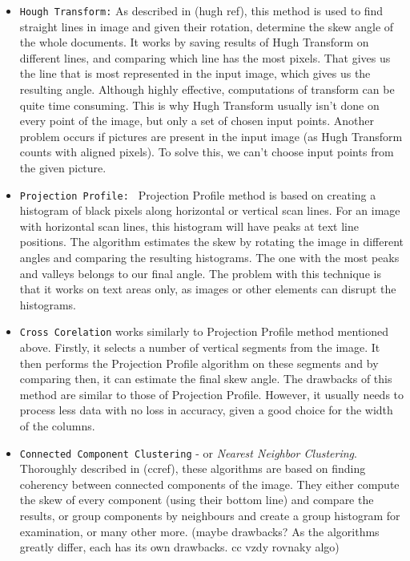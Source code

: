\begin{itemize}

\item\texttt{Hough Transform:} As described in (hugh ref), this method is used to find straight lines in image and given their rotation, determine the skew angle of the whole documents. It works by saving results of Hugh Transform on different lines, and comparing which line has the most pixels. That gives us the line that is most represented in the input image, which gives us the resulting angle. Although highly effective, computations of transform can be quite time consuming. This is why Hugh Transform usually isn't done on every point of the image, but only a set of chosen input points. Another problem occurs if pictures are present in the input image (as Hugh Transform counts with aligned pixels). To solve this, we can't choose input points from the given picture.

\item\texttt{Projection Profile: } Projection Profile method is based on creating a histogram of black pixels along horizontal or vertical scan lines. For an image with horizontal scan lines, this histogram will have peaks at text line positions. The algorithm estimates the skew by rotating the image in different angles and comparing the resulting histograms. The one with the most peaks and valleys belongs to our final angle. The problem with this technique is that it works on text areas only, as images or other elements can disrupt the histograms.

\item\texttt{Cross Corelation} works similarly to Projection Profile method mentioned above. Firstly, it selects a number of vertical segments from the image. It then performs the Projection Profile algorithm on these segments and by comparing then, it can estimate the final skew angle.
The drawbacks of this method are similar to those of Projection Profile. However, it usually needs to process less data with no loss in accuracy, given a good choice for the width of the columns.

\item\texttt{Connected Component Clustering} - or  \emph{Nearest Neighbor Clustering}. Thoroughly described in (ccref), these algorithms are based on finding coherency between connected components of the image. They either compute the skew of every component (using their bottom line) and compare the results, or group components by neighbours and create a group histogram for examination, or many other more. (maybe drawbacks? As the algorithms greatly differ, each has its own drawbacks. cc vzdy rovnaky algo)

\end{itemize}

